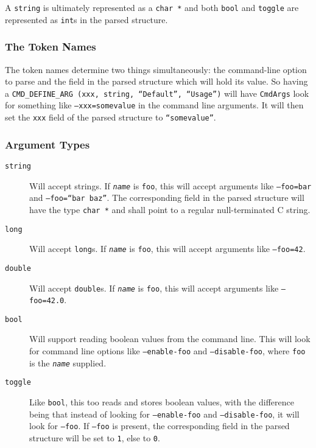\documentclass[a4paper,11pt]{article}
\begin{document}
A \texttt{string} is ultimately represented as a \texttt{char *} and both \texttt{bool} and \texttt{toggle} are represented as  \texttt{int}s in the parsed structure.

\subsubsection{The Token Names}

The token names determine two things simultaneously: the command-line option to parse and the field in the parsed structure which will hold its value. So having a \texttt{CMD\_DEFINE\_ARG (xxx, string, ``Default'', ``Usage'')} will have \texttt{CmdArgs} look for something like \texttt{--xxx=somevalue} in the command line arguments. It will then set the \texttt{xxx} field of the parsed structure to  \texttt{``somevalue''}.

\subsubsection{Argument Types}

\begin{description}

\item [\texttt{string}]
Will accept strings. If \texttt{\textit{name}} is \texttt{foo}, this will accept arguments like \texttt{--foo=bar} and \texttt{--foo=``bar baz''}. The corresponding field in the parsed structure will have the type \texttt{char *} and shall point to a regular null-terminated C string.

\item [\texttt{long}]
Will accept \texttt{long}s. If \texttt{\textit{name}} is \texttt{foo}, this will accept arguments like \texttt{--foo=42}.

\item [\texttt{double}]
Will accept \texttt{double}s. If \texttt{\textit{name}} is \texttt{foo}, this will accept arguments like \texttt{--foo=42.0}.

\item [\texttt{bool}]
Will support reading boolean values from the command line. This will look for command line options like \texttt{--enable-foo} and \texttt{--disable-foo}, where \texttt{foo} is the \texttt{\textit{name}} supplied.

\item [\texttt{toggle}]
Like \texttt{bool}, this too reads and stores boolean values, with the difference being that instead of looking for \texttt{--enable-foo} and \texttt{--disable-foo}, it will look for \texttt{--foo}. If \texttt{--foo} is present, the corresponding field in the parsed structure will be set to \texttt{1}, else to \texttt{0}.

\end{description}
\end{document}
